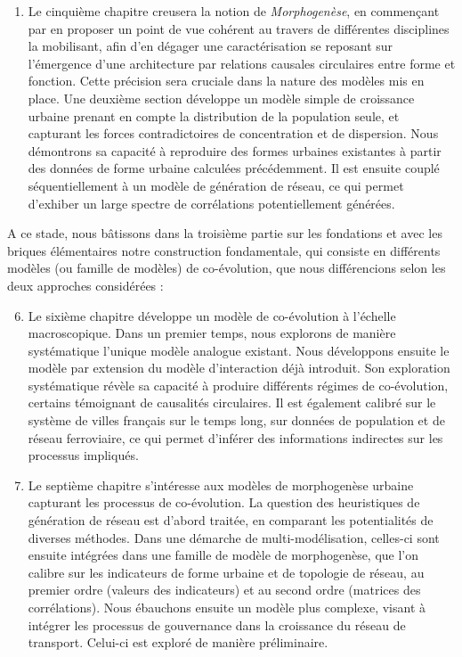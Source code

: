 {\begin{enumerate}
	\item Le cinquième chapitre creusera la notion de \emph{Morphogenèse}, en commençant par en proposer un point de vue cohérent au travers de différentes disciplines la mobilisant, afin d'en dégager une caractérisation se reposant sur l'émergence d'une architecture par relations causales circulaires entre forme et fonction. Cette précision sera cruciale dans la nature des modèles mis en place. Une deuxième section développe un modèle simple de croissance urbaine prenant en compte la distribution de la population seule, et capturant les forces contradictoires de concentration et de dispersion. Nous démontrons sa capacité à reproduire des formes urbaines existantes à partir des données de forme urbaine calculées précédemment. Il est ensuite couplé séquentiellement à un modèle de génération de réseau, ce qui permet d'exhiber un large spectre de corrélations potentiellement générées.
\end{enumerate}
A ce stade, nous bâtissons dans la troisième partie sur les fondations et avec les briques élémentaires notre construction fondamentale, qui consiste en différents modèles (ou famille de modèles) de co-évolution, que nous différencions selon les deux approches considérées :
\begin{enumerate}\setcounter{enumi}{5}
	\item Le sixième chapitre développe un modèle de co-évolution à l'échelle macroscopique. Dans un premier temps, nous explorons de manière systématique l'unique modèle analogue existant. Nous développons ensuite le modèle par extension du modèle d'interaction déjà introduit. Son exploration systématique révèle sa capacité à produire différents régimes de co-évolution, certains témoignant de causalités circulaires. Il est également calibré sur le système de villes français sur le temps long, sur données de population et de réseau ferroviaire, ce qui permet d'inférer des informations indirectes sur les processus impliqués.
	\item Le septième chapitre s'intéresse aux modèles de morphogenèse urbaine capturant les processus de co-évolution. La question des heuristiques de génération de réseau est d'abord traitée, en comparant les potentialités de diverses méthodes. Dans une démarche de multi-modélisation, celles-ci sont ensuite intégrées dans une famille de modèle de morphogenèse, que l'on calibre sur les indicateurs de forme urbaine et de topologie de réseau, au premier ordre (valeurs des indicateurs) et au second ordre (matrices des corrélations). Nous ébauchons ensuite un modèle plus complexe, visant à intégrer les processus de gouvernance dans la croissance du réseau de transport. Celui-ci est exploré de manière préliminaire.

\end{enumerate}}
